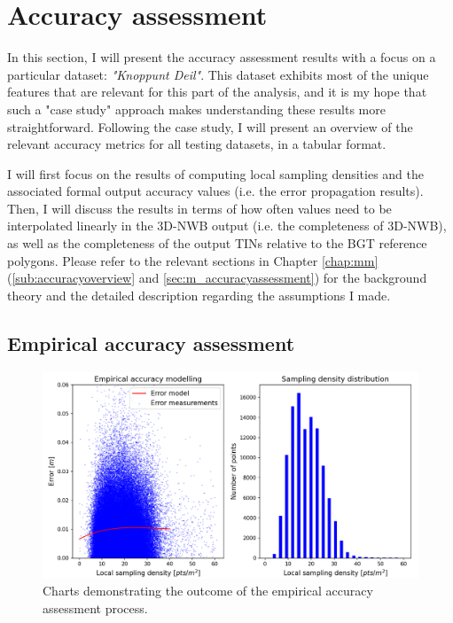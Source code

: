 \section{Accuracy assessment}
\label{sec:accuracy}

In this section, I will present the accuracy assessment results with a focus on a particular dataset: \textit{"Knoppunt Deil"}. This dataset exhibits most of the unique features that are relevant for this part of the analysis, and it is my hope that such a "case study" approach makes understanding these results more straightforward. Following the case study, I will present an overview of the relevant accuracy metrics for all testing datasets, in a tabular format.

I will first focus on the results of computing local sampling densities and the associated formal output accuracy values (i.e. the error propagation results). Then, I will discuss the results in terms of how often values need to be interpolated linearly in the 3D-NWB output (i.e. the completeness of 3D-NWB), as well as the completeness of the output TINs relative to the BGT reference polygons. Please refer to the relevant sections in Chapter \ref{chap:mm} (\ref{sub:accuracyoverview} and \ref{sec:m_accuracyassessment}) for the background theory and the detailed description regarding the assumptions I made.

\subsection{Empirical accuracy assessment}
\label{sub:accuracyempirical}

\begin{figure}[]
    \centering
    \includegraphics[width=0.9\linewidth]{final_report/figs/empiricalaccuracy0.png}
    \caption{Charts demonstrating the outcome of the empirical accuracy assessment process.}
    \label{fig:empiricalaccuracy0}
\end{figure}

